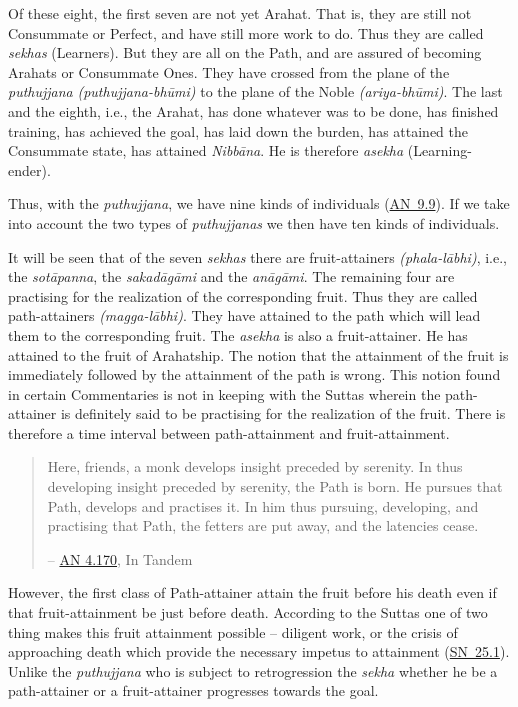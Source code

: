 Of these eight, the first seven are not yet Arahat. That is, they are still not Consummate or Perfect, and have still more work to do. Thus they are called \emph{sekhas} (Learners). But they are all on the Path, and are assured of becoming Arahats or Consummate Ones. They have crossed from the plane of the \emph{puthujjana} \emph{(puthujjana-bhūmi)} to the plane of the Noble \emph{(ariya-bhūmi)}. The last and the eighth, i.e., the Arahat, has done whatever was to be done, has finished training, has achieved the goal, has laid down the burden, has attained the Consummate state, has attained \emph{Nibbāna}. He is therefore \emph{asekha} (Learning-ender).

Thus, with the \emph{puthujjana}, we have nine kinds of individuals (\href{https://suttacentral.net/an9.9/en/sujato}{AN~9.9}). If we take into account the two types of \emph{puthujjanas} we then have ten kinds of individuals.

It will be seen that of the seven \emph{sekhas} there are fruit-attainers \emph{(phala-lābhi)}, i.e., the \emph{sotāpanna}, the \emph{sakadāgāmi} and the \emph{anāgāmi}. The remaining four are practising for the realization of the corresponding fruit. Thus they are called path-attainers \emph{(magga-lābhi)}. They have attained to the path which will lead them to the corresponding fruit. The \emph{asekha} is also a fruit-attainer. He has attained to the fruit of Arahatship. The notion that the attainment of the fruit is immediately followed by the attainment of the path is wrong. This notion found in certain Commentaries is not in keeping with the Suttas wherein the path-attainer is definitely said to be practising for the realization of the fruit. There is therefore a time interval between path-attainment and fruit-attainment.

\begin{quote}
Here, friends, a monk develops insight preceded by serenity. In thus developing insight preceded by serenity, the Path is born. He pursues that Path, develops and practises it. In him thus pursuing, developing, and practising that Path, the fetters are put away, and the latencies cease.

 -- \href{https://suttacentral.net/an4.170/en/thanissaro}{AN 4.170}, In Tandem
\end{quote}

However, the first class of Path-attainer  attain the fruit before his death even if that fruit-attainment be just before death. According to the Suttas one of two thing makes this fruit attainment possible -- diligent work, or the crisis of approaching death which provide the necessary impetus to attainment (\href{https://suttacentral.net/sn25.1/en/sujato}{SN~25.1}). Unlike the \emph{puthujjana} who is subject to retrogression the \emph{sekha} whether he be a path-attainer or a fruit-attainer progresses towards the goal.

